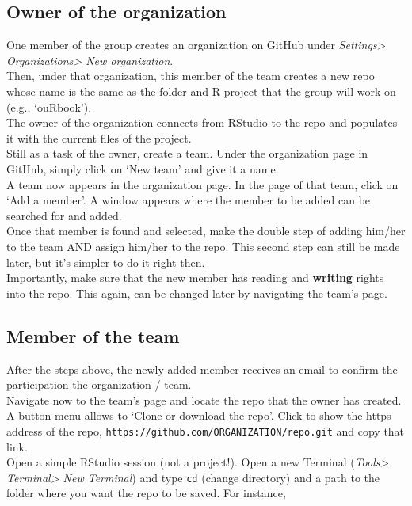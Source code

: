 \documentclass[]{book}
\theoremstyle{definition}
\theoremstyle{definition}
\theoremstyle{definition}
\theoremstyle{remark}
\begin{document}
\hypertarget{owner-of-the-organization}{%
\subsection{Owner of the organization}\label{owner-of-the-organization}}

One member of the group creates an organization on GitHub under
\emph{Settings\textgreater{} Organizations\textgreater{} New
organization}.\\
Then, under that organization, this member of the team creates a new
repo whose name is the same as the folder and R project that the group
will work on (e.g., `ouRbook').\\
The owner of the organization connects from RStudio to the repo and
populates it with the current files of the project.\\
Still as a task of the owner, create a team. Under the organization page
in GitHub, simply click on `New team' and give it a name.\\
A team now appears in the organization page. In the page of that team,
click on `Add a member'. A window appears where the member to be added
can be searched for and added.\\
Once that member is found and selected, make the double step of adding
him/her to the team AND assign him/her to the repo. This second step can
still be made later, but it's simpler to do it right then.\\
Importantly, make sure that the new member has reading and
\textbf{writing} rights into the repo. This again, can be changed later
by navigating the team's page.

\hypertarget{member-of-the-team}{%
\subsection{Member of the team}\label{member-of-the-team}}

After the steps above, the newly added member receives an email to
confirm the participation the organization / team.\\
Navigate now to the team's page and locate the repo that the owner has
created.\\
A button-menu allows to `Clone or download the repo'. Click to show the
https address of the repo,
\texttt{https://github.com/ORGANIZATION/repo.git} and copy that link.\\
Open a simple RStudio session (not a project!). Open a new Terminal
(\emph{Tools\textgreater{} Terminal\textgreater{} New Terminal}) and
type \texttt{cd} (change directory) and a path to the folder where you
want the repo to be saved. For instance,
\end{document}
